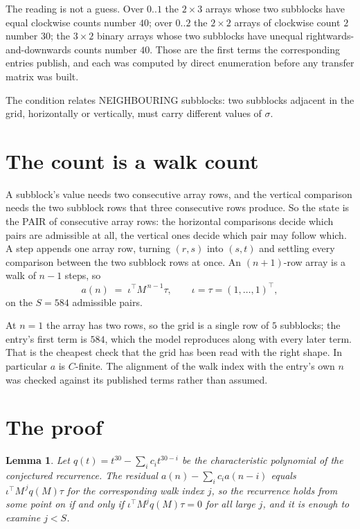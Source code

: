 \documentclass[11pt,a4paper]{article}
\theoremstyle{plain}
\newtheorem{lemma}[theorem]{Lemma}
\theoremstyle{definition}
\begin{document}
The reading is not a guess. Over $0..1$ the $2\times3$ arrays whose two subblocks have equal
clockwise counts number $40$; over $0..2$ the $2\times2$ arrays of clockwise count $2$ number
$30$; the $3\times2$ binary arrays whose two subblocks have unequal rightwards-and-downwards
counts number $40$. Those are the first terms the corresponding entries publish, and each was
computed by direct enumeration before any transfer matrix was built.

The condition relates NEIGHBOURING subblocks: two subblocks adjacent in the grid, horizontally
or vertically, must carry different values of $\sigma$.

\section{The count is a walk count}

A subblock's value needs two consecutive array rows, and the vertical
comparison needs the two subblock rows that three consecutive rows produce. So the state is the
PAIR of consecutive array rows: the horizontal comparisons decide which pairs are admissible at
all, the vertical ones decide which pair may follow which. A step appends one array row,
turning $(r,s)$ into $(s,t)$ and settling every comparison between the two subblock rows at
once. An $(n+1)$-row array is a walk of $n-1$ steps, so
\[
a(n)\;=\;\iota^{\!\top}M^{\,n-1}\tau,\qquad\iota=\tau=(1,\dots,1)^{\!\top},
\]
on the $S=584$ admissible pairs.

At $n=1$ the array has two rows, so the grid is a single row of $5$
subblocks; the entry's first term is $584$, which the model
reproduces along with every later term. That is the cheapest check that the grid has been read
with the right shape.
In particular $a$ is $C$-finite. The alignment of the walk index with the entry's own $n$ was
checked against its published terms rather than assumed.

\section{The proof}

\begin{lemma}\label{lem:crit}
Let $q(t)=t^{30}-\sum_i c_it^{30-i}$ be the characteristic polynomial of the
conjectured recurrence. The residual $a(n)-\sum_ic_ia(n-i)$ equals
$\iota^{\!\top}M^{\,j}q(M)\tau$ for the corresponding walk index $j$, so the recurrence
holds from some point on if and only if $\iota^{\!\top}M^{j}q(M)\tau=0$ for all large $j$,
and it is enough to examine $j<S$.
\end{lemma}
\end{document}
